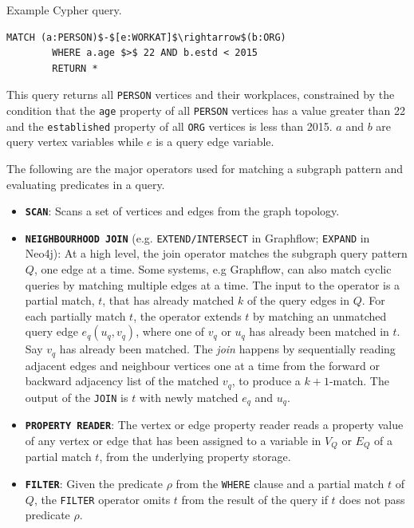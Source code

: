 \begin{example}
	\vspace{5pt}
	\label{ex:cypher-example}
	Example Cypher query. 
	{\em 
		\begin{lstlisting}[numbers=none,  showstringspaces=false,belowskip=0pt ]
		MATCH (a:PERSON)$-$[e:WORKAT]$\rightarrow$(b:ORG)
		WHERE a.age $>$ 22 AND b.estd < 2015
		RETURN *\end{lstlisting}
	}
	\noindent This query returns all \texttt{PERSON} vertices and their workplaces, constrained by the condition that the \textsc{}\texttt{age}\textsc{} property of all \texttt{PERSON} vertices has a value greater than 22 and the \textsc{}\texttt{established}\textsc{} property of all \texttt{ORG} vertices is less than 2015. $a$ and $b$ are query vertex variables while $e$ is a query edge variable.
\end{example}

The following are the major operators used for matching a subgraph pattern and evaluating predicates in a query.

\begin{itemize}
	
	\item \textbf{\texttt{SCAN}}: Scans a set of vertices and edges from the graph topology.
	
	\item \textbf{\texttt{NEIGHBOURHOOD JOIN}} (e.g. \texttt{EXTEND/INTERSECT} in Graphflow; \texttt{EXPAND} in Neo4j): At a high level, the join operator matches the subgraph query pattern $Q$, one edge at a time. Some systems, e.g Graphflow, can also match cyclic queries by matching multiple edges at a time. The input to the operator is a partial match, $t$, that has already matched $k$ of the query edges in $Q$. For each partially match $t$, the operator extends $t$ by matching an unmatched query edge $e_q(u_q, v_q)$, where one of $v_q$ or $u_q$ has already been matched in $t$. Say $v_q$ has already been matched. The \emph{join} happens by sequentially reading adjacent edges and neighbour vertices one at a time from the forward or backward adjacency list of the matched $v_q$, to produce a $k+1$-match. The output of the \texttt{JOIN} is $t$ with newly matched $e_q$ and $u_q$.
	
	\item \textbf{\texttt{PROPERTY READER}}: The vertex or edge property reader reads a property value of any vertex or edge that has been assigned to a variable in $V_Q$ or $E_Q$ of a partial match $t$, from the underlying property storage. 
	
	\item \textbf{\texttt{FILTER}}: Given the predicate $\rho$ from the \texttt{WHERE} clause and a partial match $t$ of $Q$, the \texttt{FILTER} operator omits $t$ from the result of the query if $t$ does not pass predicate $\rho$.
	
\end{itemize}

